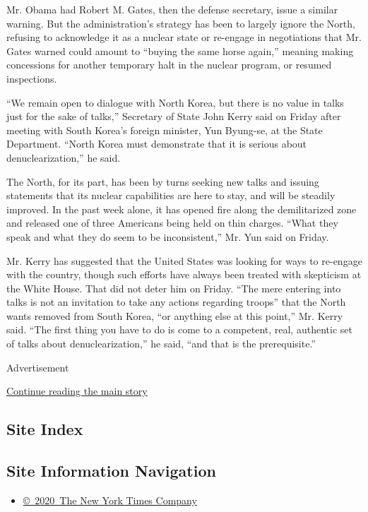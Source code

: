 Mr. Obama had Robert M. Gates, then the defense secretary, issue a
similar warning. But the administration's strategy has been to largely
ignore the North, refusing to acknowledge it as a nuclear state or
re-engage in negotiations that Mr. Gates warned could amount to ``buying
the same horse again,'' meaning making concessions for another temporary
halt in the nuclear program, or resumed inspections.

``We remain open to dialogue with North Korea, but there is no value in
talks just for the sake of talks,'' Secretary of State John Kerry said
on Friday after meeting with South Korea's foreign minister, Yun
Byung-se, at the State Department. ``North Korea must demonstrate that
it is serious about denuclearization,'' he said.

The North, for its part, has been by turns seeking new talks and issuing
statements that its nuclear capabilities are here to stay, and will be
steadily improved. In the past week alone, it has opened fire along the
demilitarized zone and released one of three Americans being held on
thin charges. ``What they speak and what they do seem to be
inconsistent,'' Mr. Yun said on Friday.

Mr. Kerry has suggested that the United States was looking for ways to
re-engage with the country, though such efforts have always been treated
with skepticism at the White House. That did not deter him on Friday.
``The mere entering into talks is not an invitation to take any actions
regarding troops'' that the North wants removed from South Korea, ``or
anything else at this point,'' Mr. Kerry said. ``The first thing you
have to do is come to a competent, real, authentic set of talks about
denuclearization,'' he said, ``and that is the prerequisite.''

Advertisement

\protect\hyperlink{after-bottom}{Continue reading the main story}

\hypertarget{site-index}{%
\subsection{Site Index}\label{site-index}}

\hypertarget{site-information-navigation}{%
\subsection{Site Information
Navigation}\label{site-information-navigation}}

\begin{itemize}
\tightlist
\item
  \href{https://help.nytimes3xbfgragh.onion/hc/en-us/articles/115014792127-Copyright-notice}{©~2020~The
  New York Times Company}
\end{itemize}

